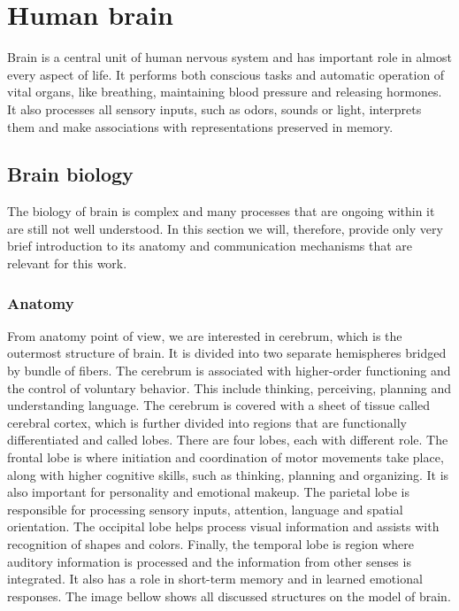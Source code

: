 \chapter{Human brain} \label{humanBrain}
Brain is a central unit of human nervous system and has important role in almost
every aspect of life. It performs both conscious tasks and automatic operation
of vital organs, like breathing, maintaining blood pressure and releasing
hormones. It also processes all sensory inputs, such as odors, sounds or light,
interprets them and make associations with representations preserved in memory.
\section{Brain biology}
The biology of brain is complex and many processes that are ongoing within it
are still not well understood. In this section we will, therefore, provide only
very brief introduction to its anatomy and communication mechanisms that are
relevant for this work.
\subsection{Anatomy}
From anatomy point of view, we are interested in cerebrum, which is the
outermost structure of brain. It is divided into two separate hemispheres
bridged by bundle of fibers. The cerebrum is associated with higher-order
functioning and the control of voluntary behavior. This include thinking,
perceiving, planning and understanding language. The cerebrum is covered with a
sheet of tissue called cerebral cortex, which is further divided into regions
that are functionally differentiated and called lobes. There are four lobes,
each with different role. The frontal lobe is where initiation and coordination
of motor movements take place, along with higher cognitive skills, such as
thinking, planning and organizing. It is also important for personality and
emotional makeup. The parietal lobe is responsible for processing sensory
inputs, attention, language and spatial orientation. The occipital lobe helps
process visual information and assists with recognition of shapes and colors.
Finally, the temporal lobe is region where auditory information is processed and
the information from other senses is integrated. It also has a role in
short-term memory and in learned emotional responses. \cite{brainFacts} The
image bellow shows all discussed structures on the model of brain.

